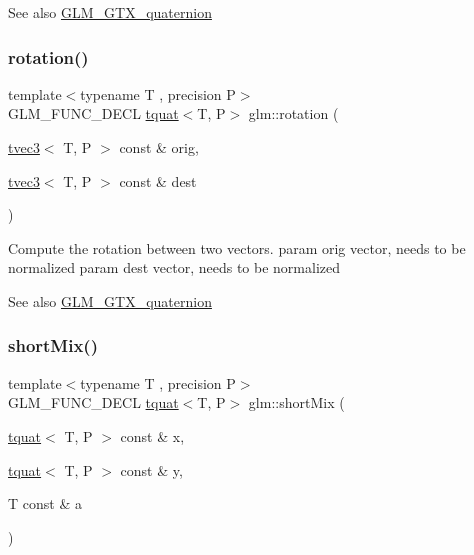 \begin{DoxySeeAlso}{See also}
\hyperlink{group__gtx__quaternion}{G\+L\+M\+\_\+\+G\+T\+X\+\_\+quaternion} 
\end{DoxySeeAlso}
\mbox{\label{group__gtx__quaternion_gac4856d356c5c97cec74e9b672ea89240}} 
\subsubsection{\texorpdfstring{rotation()}{rotation()}}
{\footnotesize\ttfamily template$<$typename T , precision P$>$ \\
G\+L\+M\+\_\+\+F\+U\+N\+C\+\_\+\+D\+E\+CL \hyperlink{structglm_1_1tquat}{tquat}$<$T, P$>$ glm\+::rotation (\begin{DoxyParamCaption}\item[{\hyperlink{structglm_1_1tvec3}{tvec3}$<$ T, P $>$ const \&}]{orig,  }\item[{\hyperlink{structglm_1_1tvec3}{tvec3}$<$ T, P $>$ const \&}]{dest }\end{DoxyParamCaption})}

Compute the rotation between two vectors. param orig vector, needs to be normalized param dest vector, needs to be normalized

\begin{DoxySeeAlso}{See also}
\hyperlink{group__gtx__quaternion}{G\+L\+M\+\_\+\+G\+T\+X\+\_\+quaternion} 
\end{DoxySeeAlso}
\mbox{\label{group__gtx__quaternion_ga3534443de2a1a806f386976546cddc81}} 
\subsubsection{\texorpdfstring{short\+Mix()}{shortMix()}}
{\footnotesize\ttfamily template$<$typename T , precision P$>$ \\
G\+L\+M\+\_\+\+F\+U\+N\+C\+\_\+\+D\+E\+CL \hyperlink{structglm_1_1tquat}{tquat}$<$T, P$>$ glm\+::short\+Mix (\begin{DoxyParamCaption}\item[{\hyperlink{structglm_1_1tquat}{tquat}$<$ T, P $>$ const \&}]{x,  }\item[{\hyperlink{structglm_1_1tquat}{tquat}$<$ T, P $>$ const \&}]{y,  }\item[{T const \&}]{a }\end{DoxyParamCaption})}

